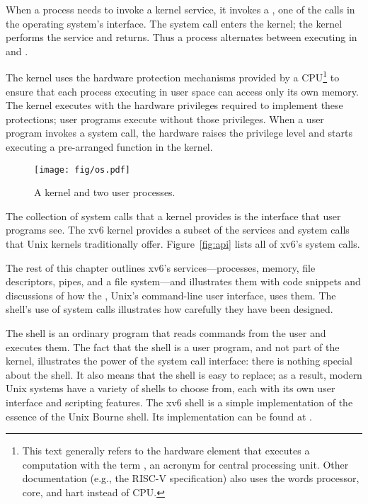 When a
process needs to invoke a kernel service, it invokes 
a ,
one of the calls
in the operating system's interface.
The system call enters the kernel;
the kernel performs the service and returns.
Thus a process alternates between executing in
and
.

The kernel uses the hardware protection mechanisms provided by a
CPU\footnote{
This text generally refers to the hardware element that executes a
computation with the term , an acronym for central
processing unit.  Other documentation (e.g., the RISC-V specification)
also uses the words processor, core, and hart instead of CPU.
}
to
ensure that each process executing in user space can access only
its own memory.
The kernel executes with the hardware privileges required to
implement these protections; user programs execute without
those privileges.
When a user program invokes a system call, the hardware
raises the privilege level and starts executing a pre-arranged
function in the kernel.

\begin{figure}[t]
\center
\texttt{[image: fig/os.pdf]}
\caption{A kernel and two user processes.}
\label{fig:os}
\end{figure}

The collection of system calls that a kernel provides
is the interface that user programs see.
The xv6 kernel provides a subset of the services and system calls
that Unix kernels traditionally offer.  
Figure~\ref{fig:api} 
lists all of xv6's system calls.

The rest of this chapter outlines xv6's services---processes, memory,
file descriptors, pipes, and a file system---and illustrates them with
code snippets and discussions of how the , 
Unix's command-line user interface, uses
them. The shell's use of system calls illustrates how carefully they
have been designed.

The shell is an ordinary program that reads commands from the user
and executes them.
The fact that the shell is a user program, and not part of the kernel,
illustrates the power of the system call interface: there is nothing
special about the shell.
It also means that the shell is easy to replace; as a result,
modern Unix systems have a variety of
shells to choose from, each with its own user interface
and scripting features.
The xv6 shell is a simple implementation of the essence of
the Unix Bourne shell.  Its implementation can be found at 
.
